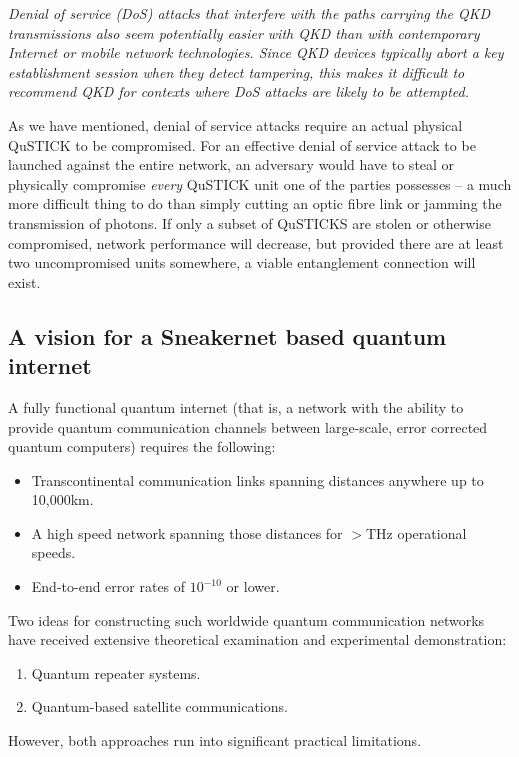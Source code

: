 \documentclass[twocolumn, aps, rmp, amsmath, amssymb, nofootinbib, superscriptaddress, longbibliography, floatfix, table-of-contents, eqsecnum]{revtex4-2}
\begin{document}
\textit{Denial of service (DoS) attacks that interfere with the paths carrying the QKD transmissions also seem potentially easier with QKD than with contemporary Internet or mobile network technologies. Since QKD devices typically abort a key establishment session when they detect tampering, this makes it difficult to recommend QKD for contexts where DoS attacks are likely to be attempted.}

As we have mentioned, denial of service attacks require an actual physical QuSTICK to be compromised. For an effective denial of service attack to be launched against the entire network, an adversary would have to steal or physically compromise \textit{every} QuSTICK unit one of the parties possesses -- a much more difficult thing to do than simply cutting an optic fibre link or jamming the transmission of photons. If only a subset of QuSTICKS are stolen or otherwise compromised, network performance will decrease, but provided there are at least two uncompromised units somewhere, a viable entanglement connection will exist. 

\subsection{A vision for a Sneakernet based quantum internet}

A fully functional quantum internet (that is, a network with the ability to provide quantum communication channels between large-scale, error corrected quantum computers) requires the following:
\begin{itemize}
\item Transcontinental communication links spanning distances anywhere up to 10,000km.
\item A high speed network spanning those distances for $>$THz operational speeds.
\item End-to-end error rates of $10^{-10}$ or lower.
\end{itemize}

Two ideas for constructing such worldwide quantum communication networks have received extensive theoretical examination and experimental demonstration:
\begin{enumerate}
\item Quantum repeater systems.
\item Quantum-based satellite communications.
\end{enumerate}
However, both approaches run into significant practical limitations.
\end{document}
